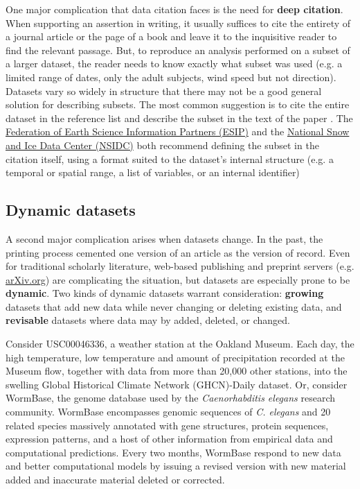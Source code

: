 \documentclass[10pt,a4paper,twocolumn]{article}
\begin{document}
{One major complication that data citation faces is the need for \textbf{deep citation}.
When supporting an assertion in writing, it usually suffices to cite the entirety of a journal article or the page of a book and leave it to the inquisitive reader to find the relevant passage.
But, to reproduce an analysis performed on a subset of a larger dataset, the reader needs to know exactly what subset was used (e.g. a limited range of dates, only the adult subjects, wind speed but not direction).
Datasets vary so widely in structure that there may not be a good general solution for describing subsets.
The most common suggestion is to cite the entire dataset in the reference list and describe the subset in the text of the paper \cite{altman_proposed_2007}.
The \href{http://wiki.esipfed.org/index.php/Interagency_Data_Stewardship/Citations/provider_guidelines#Subset_Used}{Federation of Earth Science Information Partners (ESIP)} and the \href{http://nsidc.org/about/use_copyright.html}{National Snow and Ice Data Center (NSIDC)} both recommend defining the subset in the citation itself, using a format suited to the dataset's internal structure (e.g. a temporal or spatial range, a list of variables, or an internal identifier)

\subsection*{Dynamic datasets}\label{dynamic-data}

A second major complication arises when datasets change.
In the past, the printing process cemented one version of an article as the version of record.
Even for traditional scholarly literature, web-based publishing and preprint servers (e.g. \href{http://arxiv.org/}{arXiv.org}) are complicating the situation, but datasets are especially prone to be \textbf{dynamic}.
Two kinds of dynamic datasets warrant consideration: \textbf{growing} datasets that add new data while never changing or deleting existing data, and \textbf{revisable} datasets where data may by added, deleted, or changed.

Consider USC00046336, a weather station at the Oakland Museum.
Each day, the high temperature, low temperature and amount of precipitation recorded at the Museum \cite{global_historical_climate_data_network_daily_????} flow, together with data from more than 20,000 other stations, into the swelling Global Historical Climate Network (GHCN)-Daily\cite{menne_overview_2012} dataset.
Or, consider WormBase, the genome database used by the \textit{Caenorhabditis elegans} research community.
WormBase encompasses genomic sequences of \emph{C. elegans} and 20 related species massively annotated with gene structures, protein sequences, expression patterns, and a host of other information from empirical data and computational predictions.
Every two months, WormBase respond to new data and better computational models by issuing a revised version with new material added and inaccurate material deleted or corrected.

}
\end{document}
